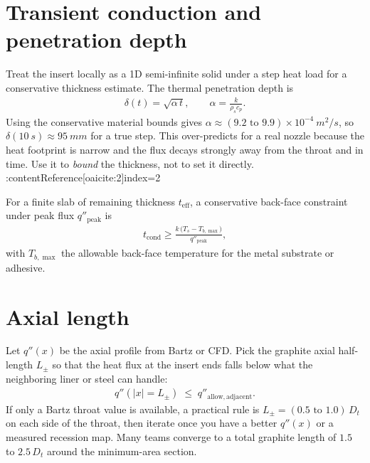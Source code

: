\documentclass[11pt]{article}
\begin{document}
\section{Transient conduction and penetration depth}
Treat the insert locally as a 1D semi-infinite solid under a step heat load for a conservative thickness estimate. The thermal penetration depth is
\begin{align}
  \delta(t) = \sqrt{\alpha\,t},\qquad
  \alpha = \frac{k}{\rho_s c_p}.
\end{align}
Using the conservative material bounds gives $\alpha\approx (9.2\text{ to }9.9)\times10^{-4}\ \si{m^2/s}$, so
$\delta(\SI{10}{s}) \approx \SI{95}{mm}$ for a true step. This over-predicts for a real nozzle because the heat footprint is narrow and the flux decays strongly away from the throat and in time. Use it to \emph{bound} the thickness, not to set it directly. :contentReference[oaicite:2]{index=2}

For a finite slab of remaining thickness $t_{\mathrm{eff}}$, a conservative back-face constraint under peak flux $q''_{\mathrm{peak}}$ is
\begin{align}
  t_{\mathrm{cond}} \ge
  \frac{k\,\bigl(T_s - T_{b,\max}\bigr)}{q''_{\mathrm{peak}}},
  \label{eq:tcond}
\end{align}
with $T_{b,\max}$ the allowable back-face temperature for the metal substrate or adhesive.

\section{Axial length}
Let $q''(x)$ be the axial profile from Bartz or CFD. Pick the graphite axial half-length $L_\pm$ so that the heat flux at the insert ends falls below what the neighboring liner or steel can handle:
\begin{align}
  q''(|x|=L_\pm)\;\le\; q''_{\mathrm{allow,adjacent}}.
\end{align}
If only a Bartz throat value is available, a practical rule is $L_\pm=(0.5\text{ to }1.0)\,D_t$ on each side of the throat, then iterate once you have a better $q''(x)$ or a measured recession map. Many teams converge to a total graphite length of $1.5$ to $2.5\,D_t$ around the minimum-area section.
\end{document}
